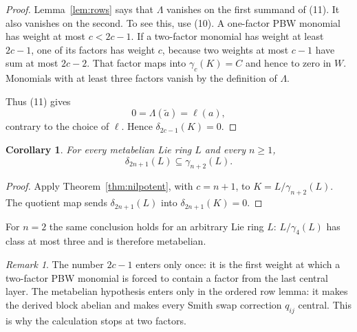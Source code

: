 \documentclass[11pt]{amsart}
\newtheorem{corollary}[theorem]{Corollary}
\theoremstyle{remark}
\newtheorem{remark}[theorem]{Remark}
\newcommand{\gm}{\gamma}
\begin{document}
\begin{proof}
Lemma~\ref{lem:rows} says that $\Lambda$ vanishes on the first summand
of (11).  It also vanishes on the second.  To see this, use (10).  A
one-factor PBW monomial has weight at most $c<2c-1$.  If a two-factor
monomial has weight at least $2c-1$, one of its factors has weight $c$,
because two weights at most $c-1$ have sum at most $2c-2$.  That factor
maps into $\gm_c(K)=C$ and hence to zero in $W$.  Monomials with at
least three factors vanish by the definition of $\Lambda$.

Thus (11) gives
\[
                       0=\Lambda(\widetilde a)=\ell(a),
\]
contrary to the choice of $\ell$.  Hence $\delta_{2c-1}(K)=0$.
\end{proof}

\begin{corollary}\label{cor:main}
For every metabelian Lie ring $L$ and every $n\geq1$,
\[
                         \delta_{2n+1}(L)
                         \subseteq\gm_{n+2}(L).
\]
\end{corollary}

\begin{proof}
Apply Theorem~\ref{thm:nilpotent}, with $c=n+1$, to
$K=L/\gm_{n+2}(L)$.  The quotient map sends
$\delta_{2n+1}(L)$ into $\delta_{2n+1}(K)=0$.
\end{proof}

For $n=2$ the same conclusion holds for an arbitrary Lie ring $L$:
$L/\gm_4(L)$ has class at most three and is therefore metabelian.

\begin{remark}
The number $2c-1$ enters only once: it is the first weight at which a
two-factor PBW monomial is forced to contain a factor from the last
central layer.  The metabelian hypothesis enters only in the ordered
row lemma: it makes the derived block abelian and makes every Smith
swap correction $q_{ij}$ central.  This is why the calculation stops
at two factors.
\end{remark}
\end{document}
